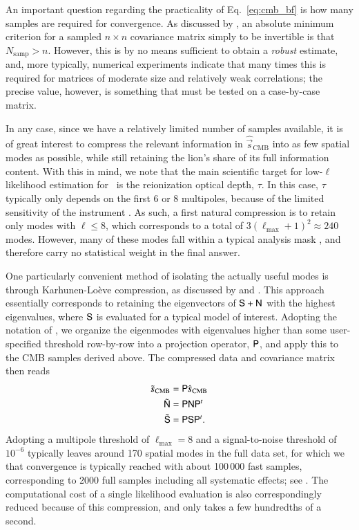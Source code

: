 \documentclass[twocolumn]{aa}
\newcommand{\s}[0]{\vec{s}}
\newcommand{\N}[0]{\tens{N}}
\renewcommand{\S}[0]{\tens{S}}
\renewcommand{\P}[0]{\tens{P}}
\begin{document}
An important question regarding the practicality of
Eq.~\eqref{eq:cmb_bf} is how many samples are required for
convergence. As discussed by \citet{sellentin2016}, an absolute
minimum criterion for a sampled $n\times n$ covariance matrix simply
to be invertible is that $N_{\mathrm{samp}} > n$. However, this is by
no means sufficient to obtain a \emph{robust} estimate, and, more
typically, numerical experiments indicate that many times this is
required for matrices of moderate size and relatively weak
correlations; the precise value, however, is something that must be
tested on a case-by-case matrix.

In any case, since we have a relatively limited number of samples
available, it is of great interest to compress the relevant
information in $\hat{\s}_{\mathrm{CMB}}$ into as few spatial modes as
possible, while still retaining the lion's share of its full
information content. With this in mind, we note that the main
scientific target for low-$\ell$ likelihood estimation for \Planck\ is
the reionization optical depth, $\tau$. In this case, $\tau$
typically only depends on the first 6 or 8 multipoles, because of the
limited sensitivity of the instrument \citep{planck2016-l05}. As such,
a first natural compression is to retain only modes with $\ell \le 8$,
which corresponds to a total of $3(\ell_{\mathrm{max}}+1)^2\approx
240$ modes. However, many of these modes fall within a typical
analysis mask \citep{bp11}, and therefore carry no statistical weight
in the final answer.

One particularly convenient method of isolating the actually useful
modes is through Karhunen-Lo\`eve compression, as discussed by
\citet{tegmark1997} and \citet{gjerlow2015}. This approach essentially
corresponds to retaining the eigenvectors of $\S+\N$ with the highest
eigenvalues, where $\S$ is evaluated for a typical model of
interest. Adopting the notation of \citet{gjerlow2015}, we organize
the eigenmodes with eigenvalues higher than some user-specified
threshold row-by-row into a projection operator, $\P$, and apply this
to the CMB samples derived above. The compressed data and covariance
matrix then reads
\begin{align}
  \tilde{\s}_{\mathrm{CMB}} &= \P\hat{\s}_{\mathrm{CMB}}\\
  \tilde{\N} &= \P\N\P^t \\
  \tilde{\S} &= \P\S\P^t.
\end{align}
Adopting a multipole threshold of $\ell_{\mathrm{max}}=8$ and a
signal-to-noise threshold of $10^{-6}$ typically leaves around 170
spatial modes in the full data set, for which we that convergence is
typically reached with about 100\,000 fast samples, corresponding to
2000 full samples including all systematic effects; see
\citet{bp12}. The computational cost of a single likelihood evaluation
is also correspondingly reduced because of this compression, and only
takes a few hundredths of a second.
\end{document}
